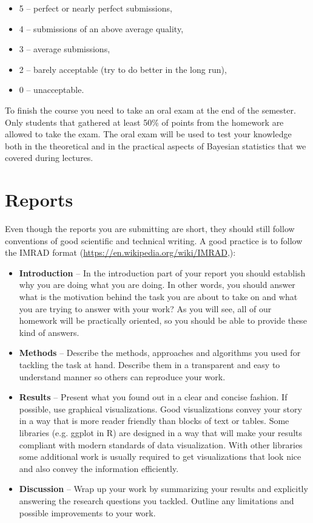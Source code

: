 \documentclass[fleqn,moreauthors,10pt]{ds_report}
\begin{document}
\begin{itemize}
	\item 5 -- perfect or nearly perfect submissions,
	\item 4 -- submissions of an above average quality,
	\item 3 -- average submissions,
	\item 2 -- barely acceptable (try to do better in the long run),
	\item 0 -- unacceptable.
\end{itemize}

To finish the course you need to take an oral exam at the end of the semester. Only students that gathered at least 50\% of points from the homework are allowed to take the exam. The oral exam will be used to test your knowledge both in the theoretical and in the practical aspects of Bayesian statistics that we covered during lectures.

\section*{Reports}

Even though the reports you are submitting are short, they should still follow conventions of good scientific and technical writing. A good practice is to follow the IMRAD format (\url{https://en.wikipedia.org/wiki/IMRAD},):

\begin{itemize}
	\item \textbf{Introduction} -- In the introduction part of your report you should establish why you are doing what you are doing. In other words, you should answer what is the motivation behind the task you are about to take on and what you are trying to answer with your work? As you will see, all of our homework will be practically oriented, so you should be able to provide these kind of answers.
	\item \textbf{Methods} -- Describe the methods, approaches and algorithms you used for tackling the task at hand. Describe them in a transparent and easy to understand manner so others can reproduce your work.
	\item \textbf{Results} -- Present what you found out in a clear and concise fashion. If possible, use graphical visualizations. Good visualizations convey your story in a way that is more reader friendly than blocks of text or tables. Some libraries (e.g. ggplot in R) are designed in a way that will make your results compliant with modern standards of data visualization. With other libraries some additional work is usually required to get visualizations that look nice and also convey the information efficiently.
	\item \textbf{Discussion} -- Wrap up your work by summarizing your results and explicitly answering the research questions you tackled. Outline any limitations and possible improvements to your work.
\end{itemize}
\end{document}
